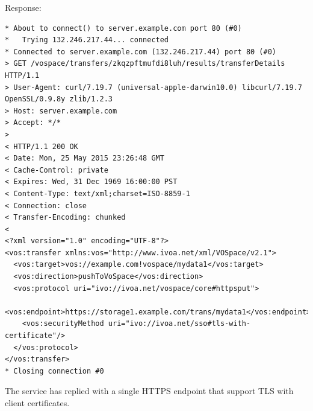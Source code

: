 \documentclass[11pt,a4paper]{ivoa}
\begin{document}
Response:
\begin{lstlisting}
* About to connect() to server.example.com port 80 (#0)
*   Trying 132.246.217.44... connected
* Connected to server.example.com (132.246.217.44) port 80 (#0)
> GET /vospace/transfers/zkqzpftmufdi8luh/results/transferDetails HTTP/1.1
> User-Agent: curl/7.19.7 (universal-apple-darwin10.0) libcurl/7.19.7 OpenSSL/0.9.8y zlib/1.2.3
> Host: server.example.com
> Accept: */*
>
< HTTP/1.1 200 OK
< Date: Mon, 25 May 2015 23:26:48 GMT
< Cache-Control: private
< Expires: Wed, 31 Dec 1969 16:00:00 PST
< Content-Type: text/xml;charset=ISO-8859-1
< Connection: close
< Transfer-Encoding: chunked
<
<?xml version="1.0" encoding="UTF-8"?>
<vos:transfer xmlns:vos="http://www.ivoa.net/xml/VOSpace/v2.1">
  <vos:target>vos://example.com!vospace/mydata1</vos:target>
  <vos:direction>pushToVoSpace</vos:direction>
  <vos:protocol uri="ivo://ivoa.net/vospace/core#httpsput">
    <vos:endpoint>https://storage1.example.com/trans/mydata1</vos:endpoint>
    <vos:securityMethod uri="ivo://ivoa.net/sso#tls-with-certificate"/>
  </vos:protocol>
</vos:transfer>
* Closing connection #0
\end{lstlisting}
The service has replied with a single HTTPS endpoint that support TLS with client certificates.
\end{document}
